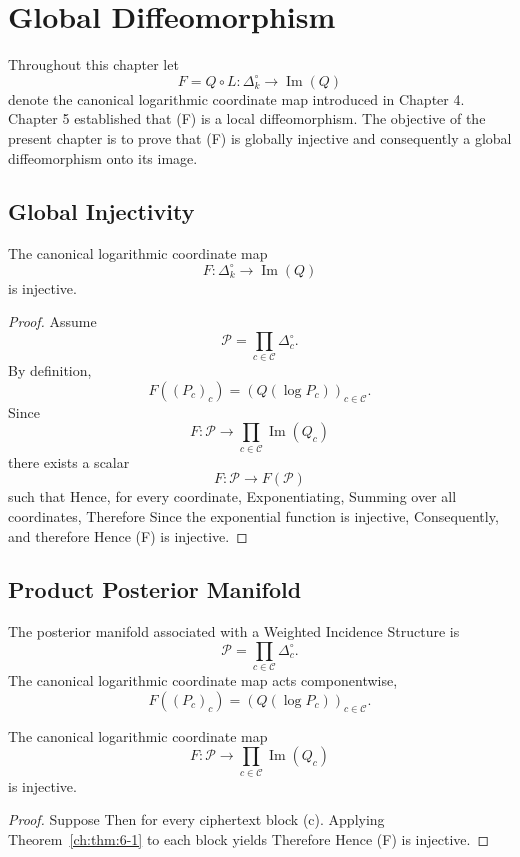 \chapter[Global Diffeomorphism]{Global Diffeomorphism}
Throughout this chapter let
\[
F = Q \circ L :
\Delta_k^\circ
\longrightarrow
\operatorname{Im}(Q)
\]
denote the canonical logarithmic coordinate map introduced in Chapter 4.
Chapter 5 established that (F) is a local diffeomorphism. The objective
of the present chapter is to prove that (F) is globally injective and
consequently a global diffeomorphism onto its image.
\section{Global Injectivity}
\begin{theorem}
\label{ch:thm:6-1}
The canonical logarithmic coordinate map
\[
F :
\Delta_k^\circ
\longrightarrow
\operatorname{Im}(Q)
\]
is injective.
\end{theorem}
\begin{proof}
Assume
\[
\mathcal P
=
\prod_{c\in\mathcal C}
\Delta_c^\circ.
\]
By definition,
\[
F((P_c)_c)
=
(Q(\log P_c))_{c\in\mathcal C}.
\]
Since
\[
F :
\mathcal P
\longrightarrow
\prod_{c\in\mathcal C}\operatorname{Im}(Q_c)
\]
there exists a scalar
\[
F :
\mathcal P
\longrightarrow
F(\mathcal P)
\]
such that
Hence, for every coordinate,
Exponentiating,
Summing over all coordinates,
Therefore
Since the exponential function is injective,
Consequently,
and therefore
Hence (F) is injective. 
\end{proof}
\section{Product Posterior Manifold}
The posterior manifold associated with a Weighted Incidence Structure is
\[
\mathcal P
=
\prod_{c\in\mathcal C}
\Delta_c^\circ.
\]
The canonical logarithmic coordinate map acts componentwise,
\[
F((P_c)_c)
=
(Q(\log P_c))_{c\in\mathcal C}.
\]
\begin{corollary}
\label{ch:cor:6-2}
The canonical logarithmic coordinate map
\[
F :
\mathcal P
\longrightarrow
\prod_{c\in\mathcal C}\operatorname{Im}(Q_c)
\]
is injective.
\end{corollary}
\begin{proof}
Suppose
Then
for every ciphertext block (c).
Applying Theorem~\ref{ch:thm:6-1} to each block yields
Therefore
Hence (F) is injective. 
\end{proof}
